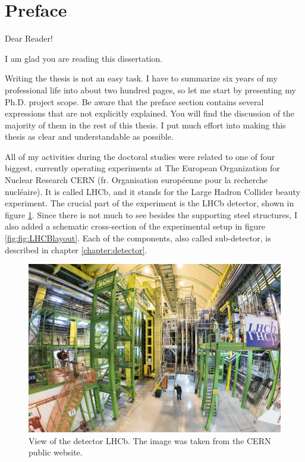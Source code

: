 \chapter*{Preface}
\label{introduction}

Dear Reader! 

I am glad you are reading this dissertation.  

Writing the thesis is not an easy task. I have to summarize six years of my professional life into about two hundred pages, so let me start by presenting my Ph.D. project scope.  Be aware that the preface section contains several expressions that are not explicitly explained. You will find the discussion of the majority of them in the rest of this thesis.  I put much effort into making this thesis as clear and understandable as possible. 

All of my activities during the doctoral studies were related to one of four biggest, currently operating experiments at The European Organization for Nuclear Research CERN (fr.  Organisation européenne pour la recherche nucléaire).  It is called LHCb, and it stands for the Large Hadron Collider beauty experiment. The crucial part of the experiment is the LHCb detector, shown in figure \ref{fig:LHCBphoto}. Since there is not much to see besides the supporting steel structures, I also added a schematic cross-section of the experimental setup in figure \ref{fig:fig:LHCBlayout}. Each of the components, also called sub-detector, is described in chapter \ref{chapter:detector}. 


\begin{figure}[!hb]
\centering
\includegraphics[width=\textwidth]{figures/LHCB_photo}
\caption{View of the detector LHCb. The image was taken from the CERN public website. 
\label{fig:LHCBphoto}}
\end{figure}

